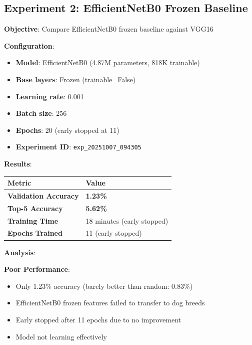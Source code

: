 \documentclass[
  letterpaper,
  DIV=11,
  numbers=noendperiod]{scrartcl}
\providecommand{\tightlist}{%
  \setlength{\itemsep}{0pt}\setlength{\parskip}{0pt}}
\begin{document}
\subsection{Experiment 2: EfficientNetB0 Frozen
Baseline}\label{experiment-2-efficientnetb0-frozen-baseline}

\textbf{Objective}: Compare EfficientNetB0 frozen baseline against VGG16

\textbf{Configuration}:

\begin{itemize}
\tightlist
\item
  \textbf{Model}: EfficientNetB0 (4.87M parameters, 818K trainable)
\item
  \textbf{Base layers}: Frozen (trainable=False)
\item
  \textbf{Learning rate}: 0.001
\item
  \textbf{Batch size}: 256
\item
  \textbf{Epochs}: 20 (early stopped at 11)
\item
  \textbf{Experiment ID}: \texttt{exp\_20251007\_094305}
\end{itemize}

\textbf{Results}:

\begin{longtable}[]{@{}ll@{}}
\toprule\noalign{}
Metric & Value \\
\midrule\noalign{}
\endhead
\bottomrule\noalign{}
\endlastfoot
\textbf{Validation Accuracy} & \textbf{1.23\%} \\
\textbf{Top-5 Accuracy} & \textbf{5.62\%} \\
\textbf{Training Time} & 18 minutes (early stopped) \\
\textbf{Epochs Trained} & 11 (early stopped) \\
\end{longtable}

\textbf{Analysis}:

\textbf{Poor Performance}:

\begin{itemize}
\tightlist
\item
  Only 1.23\% accuracy (barely better than random: 0.83\%)
\item
  EfficientNetB0 frozen features failed to transfer to dog breeds
\item
  Early stopped after 11 epochs due to no improvement
\item
  Model not learning effectively
\end{itemize}
\end{document}
